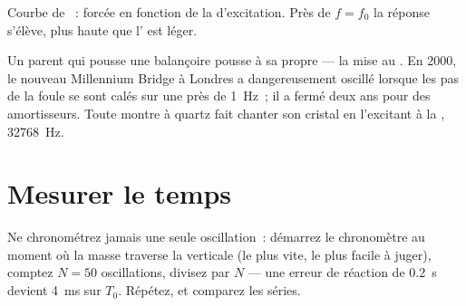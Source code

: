 \begin{omfigure}

{\small Courbe de ~: 
forcée en fonction de la  d'excitation. Près de
$f = f_0$ la réponse s'élève, plus haute que l'
est léger.}
\end{omfigure}

\begin{example}\label{ex:g12:oscillators-and-time:resonance-zoo}
Un parent qui pousse une balançoire pousse à sa propre
 --- la  mise au
. En \num{2000}, le nouveau Millennium Bridge à Londres
a dangereusement oscillé lorsque les pas de la foule se sont calés
sur une  près de \qty{1}{Hz}~; il a fermé
deux ans pour des amortisseurs. Toute montre à quartz fait chanter
son cristal en l'excitant à la ,
\qty{32768}{Hz}.
\end{example}

\section{Mesurer le temps}

\begin{method}\label{met:g12:oscillators-and-time:timing}
Ne chronométrez jamais une seule oscillation~: démarrez le
chronomètre au moment où la masse traverse la verticale (le plus
vite, le plus facile à juger), comptez $N = 50$ oscillations,
divisez par $N$ --- une erreur de réaction de \qty{0.2}{s} devient
\qty{4}{ms} sur $T_0$. Répétez, et comparez les séries.
\end{method}


